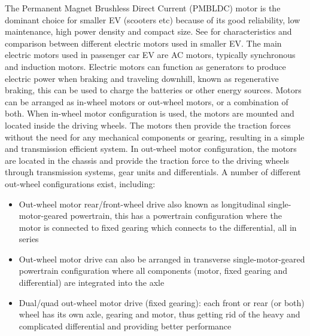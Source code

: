 The Permanent Magnet Brushless Direct Current (PMBLDC) motor is the dominant choice for smaller EV (scooters etc) because of its good reliability, low maintenance, high power density and compact size\:\cite{kumarDevelopmentSchemeKey2017}. See\:\cite{kumarDevelopmentSchemeKey2017} for characteristics and comparison between different electric motors used in smaller EV.
The main electric motors used in passenger car EV are AC motors, typically synchronous and induction motors\:\cite{khajepourElectricHybridVehicles2014}\cite{un-noorComprehensiveStudyKey2017}\cite{othaganontMultiobjectiveOptimisationBattery2017}\cite{carlenerikssonElektriskOchHybriddrivlina2023}.
Electric motors can function as generators to produce electric power when braking and traveling downhill, known as regenerative braking, this can be used to charge the batteries or other energy sources\:\cite{khajepourElectricHybridVehicles2014}\cite{un-noorComprehensiveStudyKey2017}.
Motors can be arranged as in-wheel motors or out-wheel motors, or a combination of both\:\cite{khajepourElectricHybridVehicles2014}\cite{carlenerikssonElektriskOchHybriddrivlina2023}. When in-wheel motor configuration is used, the motors are mounted and located inside the driving wheels\:\cite{khajepourElectricHybridVehicles2014}\cite{othaganontMultiobjectiveOptimisationBattery2017}\cite{carlenerikssonElektriskOchHybriddrivlina2023}. The motors then provide the traction forces without the need for any mechanical components or gearing, resulting in a simple and transmission efficient system\:\cite{khajepourElectricHybridVehicles2014}\cite{un-noorComprehensiveStudyKey2017}\cite{chauEVPowertrainConfigurations2014}\cite{othaganontMultiobjectiveOptimisationBattery2017}\cite{carlenerikssonElektriskOchHybriddrivlina2023}. In out-wheel motor configuration, the motors are located in the chassis and provide the traction force to the driving wheels through transmission systems, gear units and differentials\:\cite{khajepourElectricHybridVehicles2014}\cite{carlenerikssonElektriskOchHybriddrivlina2023}. A number of different out-wheel configurations exist, including\:\cite{khajepourElectricHybridVehicles2014}\cite{un-noorComprehensiveStudyKey2017}\cite{chauEVPowertrainConfigurations2014}\cite{othaganontMultiobjectiveOptimisationBattery2017}\cite{carlenerikssonElektriskOchHybriddrivlina2023}:
\begin{itemize}
	\item Out-wheel motor rear/front-wheel drive also known as longitudinal single-motor-geared powertrain, this has a powertrain configuration where the motor is connected to fixed gearing which connects to the differential, all in series
	\item Out-wheel motor drive can also be arranged in transverse single-motor-geared powertrain configuration where all components (motor, fixed gearing and differential) are integrated into the axle
	\item Dual/quad out-wheel motor drive (fixed gearing): each front or rear (or both) wheel has its own axle, gearing and motor, thus getting rid of the heavy and complicated differential and providing better performance
\end{itemize}
